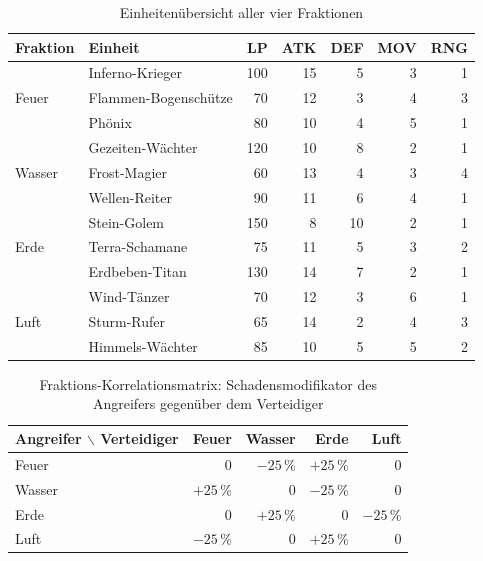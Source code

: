 \begin{table}[H]
\centering
\begin{tabular}{l l r r r r r}
\toprule
\textbf{Fraktion} & \textbf{Einheit} & \textbf{LP} & \textbf{ATK} & \textbf{DEF} & \textbf{MOV} & \textbf{RNG} \\
\midrule
\multirow{3}{*}{Feuer}
 & Inferno-Krieger      & 100 & 15 &  5 & 3 & 1 \\
 & Flammen-Bogenschütze &  70 & 12 &  3 & 4 & 3 \\
 & Phönix               &  80 & 10 &  4 & 5 & 1 \\
\midrule
\multirow{3}{*}{Wasser}
 & Gezeiten-Wächter & 120 & 10 &  8 & 2 & 1 \\
 & Frost-Magier     &  60 & 13 &  4 & 3 & 4 \\
 & Wellen-Reiter    &  90 & 11 &  6 & 4 & 1 \\
\midrule
\multirow{3}{*}{Erde}
 & Stein-Golem      & 150 &  8 & 10 & 2 & 1 \\
 & Terra-Schamane   &  75 & 11 &  5 & 3 & 2 \\
 & Erdbeben-Titan   & 130 & 14 &  7 & 2 & 1 \\
\midrule
\multirow{3}{*}{Luft}
 & Wind-Tänzer      &  70 & 12 &  3 & 6 & 1 \\
 & Sturm-Rufer      &  65 & 14 &  2 & 4 & 3 \\
 & Himmels-Wächter  &  85 & 10 &  5 & 5 & 2 \\
\bottomrule
\end{tabular}
\caption{Einheitenübersicht aller vier Fraktionen}
\label{tab:einheiten}
\end{table}

\begin{table}[H]
\centering
\begin{tabular}{l r r r r}
\toprule
\textbf{Angreifer $\backslash$ Verteidiger} & \textbf{Feuer} & \textbf{Wasser} & \textbf{Erde} & \textbf{Luft} \\
\midrule
Feuer  &     0 & $-25$\,\% & $+25$\,\% &     0 \\
Wasser & $+25$\,\% &     0 & $-25$\,\% &     0 \\
Erde   &     0 & $+25$\,\% &     0 & $-25$\,\% \\
Luft   & $-25$\,\% &     0 & $+25$\,\% &     0 \\
\bottomrule
\end{tabular}
\caption{Fraktions-Korrelationsmatrix: Schadensmodifikator des Angreifers gegenüber dem Verteidiger}
\label{tab:fraktions-korrelationsmatrix}
\end{table}

